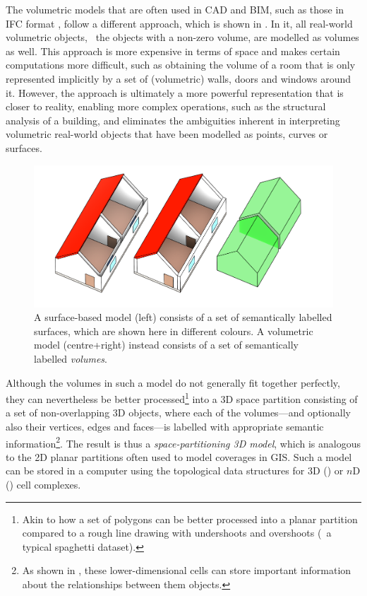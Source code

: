 The volumetric models that are often used in CAD and BIM, such as those in IFC format \citep{ISO16739:2013}, follow a different approach, which is shown in .
In it, all real-world volumetric objects, \ie\ the objects with a non-zero volume, are modelled as volumes as well.
This approach is more expensive in terms of space and makes certain computations more difficult, such as obtaining the volume of a room that is only represented implicitly by a set of (volumetric) walls, doors and windows around it.
However, the approach is ultimately a more powerful representation that is closer to reality, enabling more complex operations, such as the structural analysis of a building, and eliminates the ambiguities inherent in interpreting volumetric real-world objects that have been modelled as points, curves or surfaces.
\begin{figure}[tb]
  \centering
  \includegraphics[width=\linewidth]{figs/volumetric}
  \caption[Surface-based models vs.\ volumetric models]{A surface-based model (left) consists of a set of semantically labelled surfaces, which are shown here in different colours. A volumetric model (centre+right) instead consists of a set of semantically labelled \emph{volumes}.}
\label{fig:volumetric}
\end{figure}

Although the volumes in such a model do not generally fit together perfectly, they can nevertheless be better processed\footnote{Akin to how a set of polygons can be better processed into a planar partition compared to a rough line drawing with undershoots and overshoots (\ie\ a typical spaghetti dataset).} into a 3D space partition consisting of a set of non-overlapping 3D objects, where each of the volumes---and optionally also their vertices, edges and faces---is labelled with appropriate semantic information\footnote{As shown in , these lower-dimensional cells can store important information about the relationships between them objects.}.
The result is thus a \emph{space-partitioning 3D model}, which is analogous to the 2D planar partitions often used to model coverages in GIS.\@
Such a model can be stored in a computer using the topological data structures for 3D () or $n$D () cell complexes.

